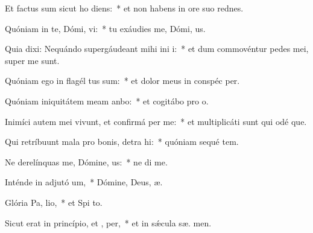 \item Et factus sum sicut ho  diens:~* et non habens in ore suo rednes.
\item Quóniam in te, Dómi, vi:~* tu exáudies me, Dómi,  us.
\item Quia dixi: Nequándo supergáudeant mihi ini i:~* et dum commovéntur pedes mei, super me   sunt.
\item Quóniam ego in flagél tus sum:~* et dolor meus in conspéc  per.
\item Quóniam iniquitátem meam anbo:~* et cogitábo pro  o.
\item Inimíci autem mei vivunt, et confirmá  per me:~* et multiplicáti sunt qui odé  que.
\item Qui retríbuunt mala pro bonis, detra hi:~* quóniam sequé tem.
\item Ne derelínquas me, Dómine,  us:~* ne di  me.
\item Inténde in adjutó um,~* Dómine, Deus,  æ.
\item Glória Pa,  lio,~* et Spi to.
\item Sicut erat in princípio, et ,  per,~* et in sǽcula sæ. men.
